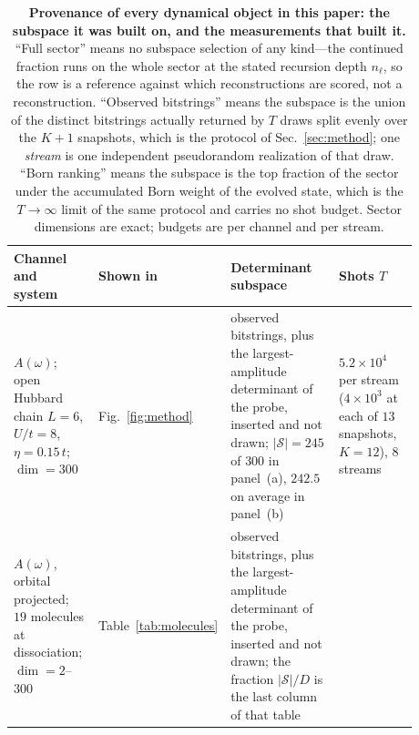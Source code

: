 \begin{table}[tp]\centering\small
\caption{\textbf{Provenance of every dynamical object in this paper: the subspace it was built on, and
the measurements that built it.} ``Full sector'' means no subspace selection of any kind---the
continued fraction runs on the whole sector at the stated recursion depth $n_\ell$, so the row is a
reference against which reconstructions are scored, not a reconstruction. ``Observed bitstrings'' means
the subspace is the union of the distinct bitstrings actually returned by $T$ draws split evenly over
the $K{+}1$ snapshots, which is the protocol of Sec.~\ref{sec:method}; one \emph{stream} is one
independent pseudorandom realization of that draw. ``Born ranking'' means the subspace is the top
fraction of the sector under the accumulated Born weight of the evolved state, which is the
$T\to\infty$ limit of the same protocol and carries no shot budget. Sector dimensions are exact; budgets
are per channel and per stream.}
\label{tab:provenance}
\setlength{\tabcolsep}{4pt}
\setlength{\parskip}{0pt}
\renewcommand{\arraystretch}{1.15}
\begin{tabular}{@{}p{0.225\linewidth}p{0.115\linewidth}p{0.315\linewidth}p{0.225\linewidth}@{}}
\toprule
\raggedright \textbf{Channel and system} & \raggedright \textbf{Shown in} & \raggedright \textbf{Determinant subspace} & \raggedright \textbf{Shots $T$}\tabularnewline
\midrule
\raggedright $A(\omega)$; open Hubbard chain $L{=}6$, $U/t{=}8$, $\eta{=}0.15\,t$; $\dim=300$
 & \raggedright Fig.~\ref{fig:method}
 & \raggedright observed bitstrings, plus the largest-amplitude determinant of the probe, inserted and not
   drawn; $|\mathcal S|=245$ of $300$ in panel~(a), $242.5$ on average in panel~(b)
 & \raggedright $5.2\times10^{4}$ per stream ($4\times10^{3}$ at each of $13$ snapshots, $K{=}12$), $8$ streams\tabularnewline
\raggedright $A(\omega)$, orbital projected; $19$ molecules at dissociation; $\dim=2$--$300$
 & \raggedright Table~\ref{tab:molecules}
 & \raggedright observed bitstrings, plus the largest-amplitude determinant of the probe, inserted and not drawn; the
   fraction $|\mathcal S|/D$ is the last column of that table

\end{tabular}
\end{table}
